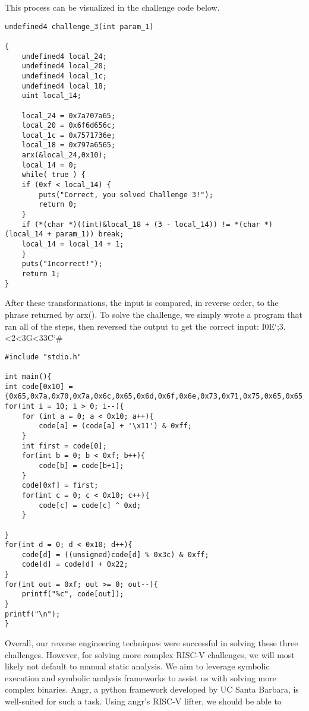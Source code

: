 This process can be visualized in the challenge code below.

\begin{lstlisting}
undefined4 challenge_3(int param_1)

{
	undefined4 local_24;
	undefined4 local_20;
	undefined4 local_1c;
	undefined4 local_18;
	uint local_14;
	
	local_24 = 0x7a707a65;
	local_20 = 0x6f6d656c;
	local_1c = 0x7571736e;
	local_18 = 0x797a6565;
	arx(&local_24,0x10);
	local_14 = 0;
	while( true ) {
	if (0xf < local_14) {
		puts("Correct, you solved Challenge 3!");
		return 0;
	}
	if (*(char *)((int)&local_18 + (3 - local_14)) != *(char *)(local_14 + param_1)) break;
	local_14 = local_14 + 1;
	}
	puts("Incorrect!");
	return 1;
}
\end{lstlisting}

After these transformations, the input is compared, in reverse order, to the phrase returned by arx(). To solve the challenge, we simply wrote a program that ran all of the steps, then reversed the output to get the correct input: I0E\char`;3.<2<3G<33C\char`#

\begin{lstlisting}
#include "stdio.h"

int main(){
int code[0x10] = {0x65,0x7a,0x70,0x7a,0x6c,0x65,0x6d,0x6f,0x6e,0x73,0x71,0x75,0x65,0x65,0x7a,0x79};
for(int i = 10; i > 0; i--){
	for (int a = 0; a < 0x10; a++){
		code[a] = (code[a] + '\x11') & 0xff;
	}
	int first = code[0];
	for(int b = 0; b < 0xf; b++){
		code[b] = code[b+1];
	}
	code[0xf] = first;
	for(int c = 0; c < 0x10; c++){
		code[c] = code[c] ^ 0xd;
	}

}
for(int d = 0; d < 0x10; d++){
	code[d] = ((unsigned)code[d] % 0x3c) & 0xff;
	code[d] = code[d] + 0x22;
}
for(int out = 0xf; out >= 0; out--){
	printf("%c", code[out]);
}
printf("\n");
}
\end{lstlisting}

Overall, our reverse engineering techniques were successful in solving these three challenges. However, for solving more complex RISC-V challenges, we will most likely not default to manual static analysis. We aim to leverage symbolic execution and symbolic analysis frameworks to assist us with solving more complex binaries. Angr, a python framework developed by UC Santa Barbara, is well-suited for such a task. Using angr's RISC-V lifter, we should be able to 